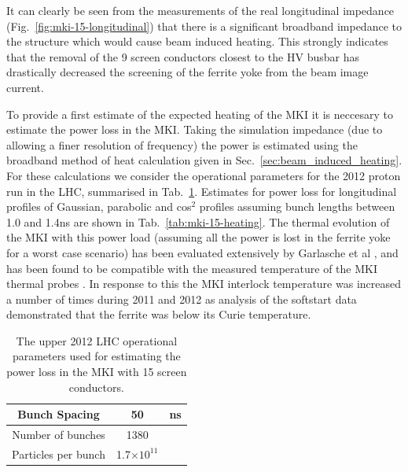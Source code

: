 It can clearly be seen from the measurements of the real longitudinal impedance (Fig.~\ref{fig:mki-15-longitudinal}) that there is a significant broadband impedance to the structure which would cause beam induced heating. This strongly indicates that the removal of the 9 screen conductors closest to the HV busbar has drastically decreased the screening of the ferrite yoke from the beam image current.

To provide a first estimate of the expected heating of the MKI it is neccesary to estimate the power loss in the MKI. Taking the simulation impedance (due to allowing a finer resolution of frequency) the power is estimated using the broadband method of heat calculation given in Sec.~\ref{sec:beam_induced_heating}. For these calculations we consider the operational parameters for the 2012 proton run in the LHC, summarised in Tab.~\ref{tab:mki-beam-parameters}. Estimates for power loss for longitudinal profiles of Gaussian, parabolic and cos$^{2}$ profiles assuming bunch lengths between 1.0 and 1.4ns are shown in Tab.~\ref{tab:mki-15-heating}. The thermal evolution of the MKI with this power load (assuming all the power is lost in the ferrite yoke for a worst case scenario) has been evaluated extensively by Garlasche et al \cite{Garlasche:2dHeat}, and has been found to be compatible with the measured temperature of the MKI thermal probes \cite{Barnes:mkiHeating}. In response to this the MKI interlock temperature was increased a number of times during 2011 and 2012 as analysis of the softstart data demonstrated that the ferrite was below its Curie temperature.

\begin{table}
\caption{The upper 2012 LHC operational parameters used for estimating the power loss in the MKI with 15 screen conductors.}
\label{tab:mki-beam-parameters}
\begin{center}
\begin{tabular}{c | c | c}
Bunch Spacing & 50 & ns \\ \hline
Number of bunches & 1380 & \\ \hline
Particles per bunch & 1.7$\times 10^{11}$ & \\
\end{tabular}
\end{center}
\end{table}

